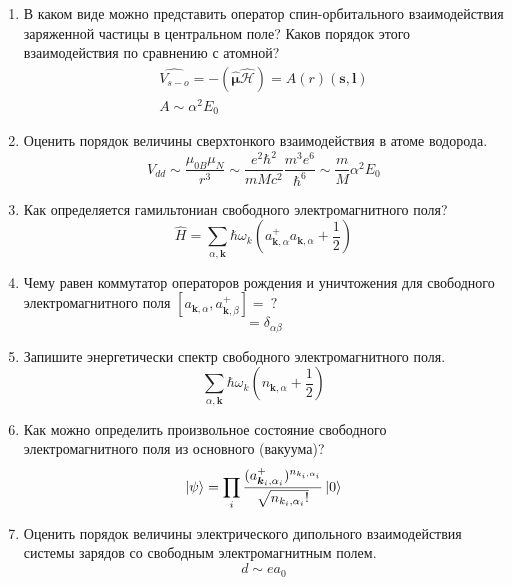 \documentclass{article}
\begin{document}
\begin{enumerate}
	\item {В каком виде можно представить оператор спин-орбитального взаимодействия заряженной частицы в центральном поле? Каков порядок этого взаимодействия по сравнению с атомной?}
	\begin{gather}
		\hat{V_{s-o}}=-(\hat{\boldsymbol{\mu}}\hat{\boldsymbol{\mathcal{H}}})=A(r)(\boldsymbol{s,l})\\
		A\sim\alpha^{2}E_{0}
	\end{gather}
	
	\item {Оценить порядок величины сверхтонкого взаимодействия в атоме водорода.}
	\begin{equation}
		V_{dd}\sim\frac{\mu_{0B}\mu_{N}}{r^{3}}\sim\frac{e^{2}\hbar^{2}}{mMc^{2}}\frac{m^{3}e^{6}}{\hbar^{6}}\sim\frac{m}{M}\alpha^{2}E_{0}
	\end{equation}
	
	\item {Как определяется гамильтониан свободного электромагнитного поля?}
	\begin{equation}
		\hat{H}=\sum_{\alpha,\boldsymbol{k}}\hbar\omega_{k}(a_{\boldsymbol{k},\alpha}^{+}a_{\boldsymbol{k},\alpha}+\frac{1}{2})
	\end{equation}
	
	\item {Чему равен коммутатор операторов рождения и уничтожения для свободного электромагнитного поля $[a_{\textbf{k},\alpha}, a^+_{\textbf{k},\beta}] = \ ?$}
	\begin{equation}
		[a_{k,\alpha}\text{, }a^+_{k,\beta}]=\delta_{\alpha\beta}
	\end{equation}
	
	\item {Запишите энергетически спектр свободного электромагнитного поля.}
	\begin{equation}
		\sum_{\alpha,\boldsymbol{\textbf{k}}}\hbar\omega_{k}(n_{\textbf{k},\alpha}+\frac{1}{2})
	\end{equation}
	
	\item {Как можно определить произвольное состояние свободного электромагнитного поля из основного (вакуума)?}
	\begin{equation}
		\ket{\psi}=\prod_{i}\frac{(a_{\boldsymbol{k}_{i},\alpha_{i}}^{+})^{n_{k_{i},\alpha_{i}}}}{\sqrt{n_{k_{i},\alpha_{i}}!}}\ket{0}
	\end{equation}
	
	\item {Оценить порядок величины электрического дипольного взаимодействия системы зарядов со свободным электромагнитным полем.}
	\begin{equation}
		d\sim ea_{0}
	\end{equation}
	

\end{enumerate}
\end{document}
